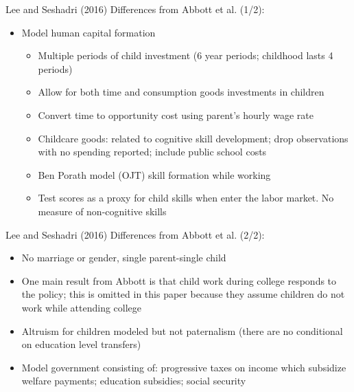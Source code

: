 \documentclass{beamer}
\begin{document}
\begin{frame}{Lee and Seshadri (2016)}
Differences from Abbott et al. (1/2): 
\begin{itemize}
\item Model human capital formation
\begin{itemize}
\item Multiple periods of child investment (6 year periods; childhood lasts 4 periods) 
\hyperlink{lstime}{}
\item Allow for both time and consumption goods investments in children
\item Convert time to opportunity cost using parent's hourly wage rate
\item Childcare goods: related to cognitive skill development; drop observations with no spending reported; include public school costs
\item Ben Porath model (OJT) skill formation while working 
\item Test scores as a proxy for child skills when enter the labor market. No measure of non-cognitive skills
\end{itemize}
\end{itemize}
\end{frame}

\begin{frame}{Lee and Seshadri (2016)}
Differences from Abbott et al. (2/2): 
\begin{itemize}
\item No marriage or gender, single parent-single child
\item One main result from Abbott is that child work during college responds to the policy; this is omitted in this paper because they assume children do not work while attending college
\item Altruism for children modeled but not paternalism (there are no conditional on education level transfers)
\item Model government consisting of: progressive taxes on income which subsidize welfare payments; education subsidies; social security 
\end{itemize}

\end{frame}

\end{document}

